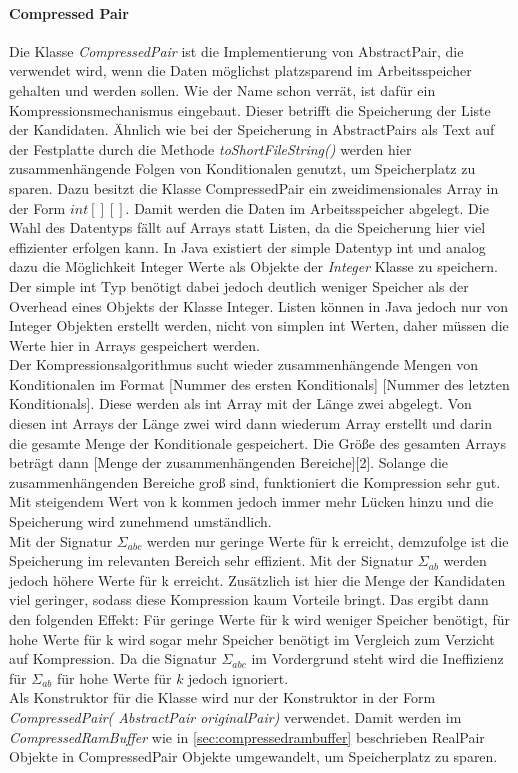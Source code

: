 \documentclass[12pt,a4paper]{article}
\begin{document}
\paragraph{Compressed Pair}
Die Klasse  \textit{CompressedPair} ist die Implementierung von AbstractPair, die verwendet wird, wenn die Daten möglichst platzsparend im Arbeitsspeicher gehalten und werden sollen. Wie der Name schon verrät, ist dafür ein Kompressionsmechanismus eingebaut. Dieser betrifft die Speicherung der Liste der Kandidaten. Ähnlich wie bei der Speicherung in AbstractPairs als Text auf der Festplatte durch die Methode \textit{toShortFileString()} werden hier zusammenhängende Folgen von Konditionalen genutzt, um Speicherplatz zu sparen. Dazu besitzt die Klasse CompressedPair ein zweidimensionales Array in der Form $int[][]$. Damit werden die Daten im Arbeitsspeicher abgelegt. Die Wahl des Datentyps fällt auf Arrays statt Listen, da die Speicherung hier viel effizienter erfolgen kann. In Java existiert der simple Datentyp int und analog dazu die Möglichkeit Integer Werte als Objekte der \textit{Integer} Klasse zu speichern. Der simple int Typ benötigt dabei jedoch deutlich weniger Speicher als der Overhead eines Objekts der Klasse Integer. Listen können in Java jedoch nur von Integer Objekten erstellt werden, nicht von simplen int Werten, daher müssen die Werte hier in Arrays gespeichert werden.\\
Der Kompressionsalgorithmus sucht wieder zusammenhängende Mengen von Konditionalen im Format [Nummer des ersten Konditionals] [Nummer des letzten Konditionals]. Diese werden als int Array mit der Länge zwei abgelegt. Von diesen int Arrays der Länge zwei wird dann wiederum Array erstellt und darin die gesamte Menge der Konditionale gespeichert. Die Größe des gesamten Arrays beträgt dann [Menge der zusammenhängenden Bereiche][2]. Solange die zusammenhängenden Bereiche groß sind, funktioniert die Kompression sehr gut. Mit steigendem Wert von k kommen jedoch immer mehr Lücken hinzu und die Speicherung wird zunehmend umständlich. \\
Mit der Signatur $\Sigma_{abc}$ werden nur geringe Werte für k erreicht, demzufolge ist die Speicherung im relevanten Bereich sehr effizient. Mit der Signatur $\Sigma_{ab}$ werden jedoch höhere Werte für k erreicht. Zusätzlich ist hier die Menge der Kandidaten viel geringer, sodass diese Kompression kaum Vorteile bringt. Das ergibt dann den folgenden Effekt: Für geringe Werte für k wird weniger Speicher benötigt, für hohe Werte für k wird sogar mehr Speicher benötigt im Vergleich zum Verzicht auf Kompression. Da die Signatur $\Sigma_{abc}$ im Vordergrund steht wird die Ineffizienz für $\Sigma_{ab}$ für hohe Werte für $k$  jedoch ignoriert.\\
Als Konstruktor für die Klasse wird nur der Konstruktor in der Form \textit{CompressedPair( AbstractPair originalPair)} verwendet. Damit werden im \textit{CompressedRamBuffer} wie in \autoref{sec:compressedrambuffer} beschrieben RealPair Objekte in CompressedPair Objekte umgewandelt, um Speicherplatz zu sparen.
\end{document}
